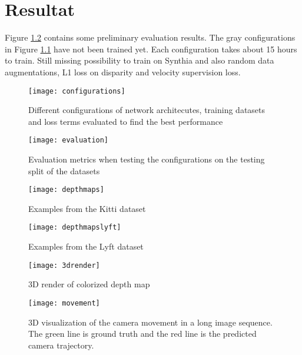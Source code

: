 \chapter{Resultat}\label{cha:Research}

Figure \ref{fig:evaluation} contains some preliminary evaluation results. The gray configurations in Figure \ref{fig:configurations} have not been trained yet. Each configuration takes about 15 hours to train. Still missing possibility to train on Synthia and also random data augmentations, L1 loss on disparity and velocity supervision loss.

\begin{figure}[H]
	\centering
	\texttt{[image: configurations]}
	\caption{Different configurations of network architecutes, training datasets and loss terms evaluated to find the best performance}
	\label{fig:configurations}
\end{figure}

\begin{figure}[H]
	\centering
	\texttt{[image: evaluation]}
	\caption{Evaluation metrics when testing the configurations on the testing split of the datasets}
	\label{fig:evaluation}
\end{figure}

\begin{figure}[H]
	\centering
	\texttt{[image: depthmaps]}
	\caption{Examples from the Kitti dataset}
	\label{fig:depthmapskitty}
\end{figure}

\begin{figure}[H]
	\centering
	\texttt{[image: depthmapslyft]}
	\caption{Examples from the Lyft dataset}
	\label{fig:depthmaplyft}
\end{figure}

\begin{figure}[H]
	\centering
	\texttt{[image: 3drender]}
	\caption{3D render of colorized depth map}
	\label{fig:3drender}
\end{figure}

\begin{figure}[H]
	\centering
	\texttt{[image: movement]}
	\caption{3D visualization of the camera movement in a long image sequence. The green line is ground truth and the red line is the predicted camera trajectory.}
	\label{fig:movement}
\end{figure}